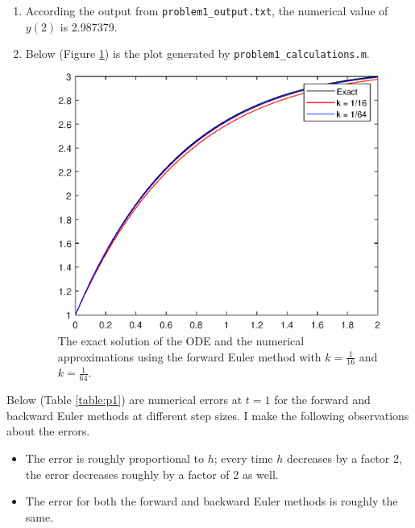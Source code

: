 \documentclass{homework}
\begin{document}
\begin{arabicparts}
\begin{enumerate}[label=({\bf\alph*})]
			\item According the output from \lstinline{problem1_output.txt}, the numerical value of $y(2)$ is 2.987379.
			\item Below (Figure \ref{fig:p13c}) is the plot generated by \lstinline{problem1_calculations.m}.
			\begin{figure}[h]
				\centering
				\includegraphics{p1.3c.eps}
				\caption{The exact solution of the ODE and the numerical approximations using the forward Euler method with $k = \frac{1}{16}$ and $k = \frac{1}{64}$.}
				\label{fig:p13c}
			\end{figure}
		\end{enumerate}
		
		\questionpart Below (Table \ref{table:p1}) are numerical errors at $t=1$ for the forward and backward Euler methods at different step sizes. I make the following observations about the errors.
		\begin{itemize}
			\item The error is roughly proportional to $h$; every time $h$ decreases by a factor 2, the error decreases roughly by a factor of 2 as well.
			\item The error for both the forward and backward Euler methods is roughly the same.
		\end{itemize}
		

\end{arabicparts}
\end{document}
